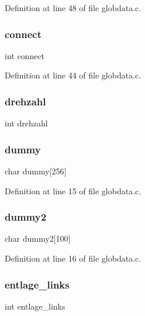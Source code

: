Definition at line 48 of file globdata.\+c.

\mbox{\label{globdata_8h_aa79ab26bef7962d86504a61edbc534a7}} 
\subsubsection{connect}
{\footnotesize\ttfamily int connect}



Definition at line 44 of file globdata.\+c.

\mbox{\label{globdata_8h_ae4f4358d6dfdc7c62030d3b829273e42}} 
\subsubsection{drehzahl}
{\footnotesize\ttfamily int drehzahl}

\mbox{\label{globdata_8h_a4dc4bd65e1b61fabca89558c3d1109c7}} 
\subsubsection{dummy}
{\footnotesize\ttfamily char dummy[256]}



Definition at line 15 of file globdata.\+c.

\mbox{\label{globdata_8h_aa5c9fb090bba18f0a9e23bff98effff1}} 
\subsubsection{dummy2}
{\footnotesize\ttfamily char dummy2[100]}



Definition at line 16 of file globdata.\+c.

\mbox{\label{globdata_8h_a86bdb94fe65ca48f7262ddcd95570ff9}} 
\subsubsection{entlage\+\_\+links}
{\footnotesize\ttfamily int entlage\+\_\+links}



